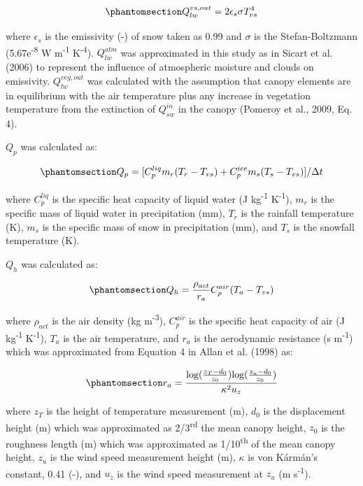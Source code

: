 \documentclass[
  letterpaper,
]{tex/uofsthesis-cs}
\begin{document}
\begin{equation}\phantomsection\label{eq-lw-vs}{
Q_{lw}^{vs, out} = 2 \epsilon_{s} \sigma T_{vs}^4
}\end{equation}

where \(\epsilon_s\) is the emissivity (-) of snow taken as 0.99 and
\(\sigma\) is the Stefan-Boltzmann (5.67e\textsuperscript{-8} W
m\textsuperscript{-1} K\textsuperscript{-4}). \(Q_{lw}^{atm}\) was
approximated in this study as in Sicart et al. (2006) to represent the
influence of atmospheric moisture and clouds on emissivity.
\(Q_{lw}^{veg, out}\) was calculated with the assumption that canopy
elements are in equilibrium with the air temperature plus any increase
in vegetation temperature from the extinction of \(Q_{sw}^{in}\) in the
canopy (Pomeroy et al., 2009, Eq. 4).

\(Q_p\) was calculated as:

\begin{equation}\phantomsection\label{eq-qp}{
Q_p = [C_p^{liq} m_r(T_r - T_{vs}) + C_p^{ice} m_s(T_s - T_{vs})] / \Delta t
}\end{equation}

where \(C_p^{liq}\) is the specific heat capacity of liquid water (J
kg\textsuperscript{-1} K\textsuperscript{-1}), \(m_r\) is the specific
mass of liquid water in precipitation (mm), \(T_r\) is the rainfall
temperature (K), \(m_s\) is the specific mass of snow in precipitation
(mm), and \(T_s\) is the snowfall temperature (K).

\(Q_h\) was calculated as:

\begin{equation}\phantomsection\label{eq-qh}{
Q_h = \frac{\rho_{act}}{r_a} C_p^{air} (T_a - T_{vs})
}\end{equation}

where \(\rho_{act}\) is the air density (kg m\textsuperscript{-3}),
\(C_p^{air}\) is the specific heat capacity of air (J
kg\textsuperscript{-1} K\textsuperscript{-1}), \(T_a\) is the air
temperature, and \(r_a\) is the aerodynamic resistance (s
m\textsuperscript{-1}) which was approximated from Equation 4 in Allan
et al. (1998) as:

\begin{equation}\phantomsection\label{eq-ra}{
r_a = \frac{\text{log}(\frac{z_T - d_0}{z_0})\text{log}(\frac{z_u - d_0}{z_0})}{\kappa^2 u_z}
}\end{equation}

where \(z_T\) is the height of temperature measurement (m), \(d_0\) is
the displacement height (m) which was approximated as
2/3\textsuperscript{rd} the mean canopy height, \(z_0\) is the roughness
length (m) which was approximated as 1/10\textsuperscript{th} of the
mean canopy height, \(z_u\) is the wind speed measurement height (m),
\(\kappa\) is von Kármán's constant, 0.41 (-), and \(u_z\) is the wind
speed measurement at \(z_u\) (m s\textsuperscript{-1}).
\end{document}
